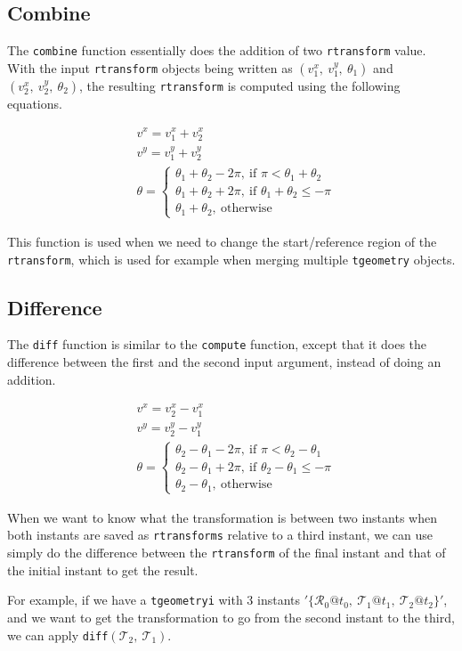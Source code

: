 \subsection{Combine}
\label{section:combine}

The \lstinline{combine} function essentially does the addition of two \lstinline{rtransform} value. With the input \lstinline{rtransform} objects being written as $(v_1^x,\ v_1^y,\ \theta_1)$ and $(v_2^x,\ v_2^y,\ \theta_2)$, the resulting \lstinline{rtransform} is computed using the following equations.

\begin{align*}
        & v^x = v_1^x + v_2^x \\
        & v^y = v_1^y + v_2^y \\
        & \theta = 
        \begin{cases}
            \theta_1 + \theta_2 - 2\pi,\ \text{if } \pi < \theta_1 + \theta_2 \\
            \theta_1 + \theta_2 + 2\pi,\ \text{if } \theta_1 + \theta_2 \le -\pi \\
            \theta_1 + \theta_2,\ \text{otherwise}
        \end{cases}
\end{align*}

This function is used when we need to change the start/reference region of the \lstinline{rtransform}, which is used for example when merging multiple \lstinline{tgeometry} objects.

\subsection{Difference}
\label{section:diff}

The \lstinline{diff} function is similar to the \lstinline+compute+ function, except that it does the difference between the first and the second input argument, instead of doing an addition.

\begin{align*}
        & v^x = v_2^x - v_1^x \\
        & v^y = v_2^y - v_1^y \\
        & \theta = 
        \begin{cases}
            \theta_2 - \theta_1 - 2\pi,\ \text{if } \pi < \theta_2 - \theta_1 \\
            \theta_2 - \theta_1 + 2\pi,\ \text{if } \theta_2 - \theta_1 \le -\pi \\
            \theta_2 - \theta_1,\ \text{otherwise}
        \end{cases}
\end{align*}

When we want to know what the transformation is between two instants when both instants are saved as \lstinline{rtransforms} relative to a third instant, we can use simply do the difference between the \lstinline{rtransform} of the final instant and that of the initial instant to get the result.

For example, if we have a \lstinline{tgeometryi} with 3 instants $'\{\mathcal{R}_0@t_0,\ \mathcal{T}_1@t_1,\ \mathcal{T}_2@t_2\}'$, and we want to get the transformation to go from the second instant to the third, we can apply \lstinline{diff}$(\mathcal{T}_2,\ \mathcal{T}_1)$.